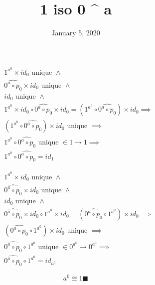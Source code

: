 \documentclass[fleqn, 11pt]{article}
\date{January 5, 2020}
\title{1 iso 0 ^ a}
\begin{document}

\begin{equation}
\tag{from}
\begin{aligned}
& 1^{a^0} \times id_0 \text{ unique } \land \\
& \widehat{0^a \circ p_0} \times id_0 \text{ unique } \land \\
& id_0 \text{ unique } \land \\
& 1^{a^0} \times id_0 \circ \widehat{0^a \circ p_0} \times id_0 =
  (1^{a^0} \circ \widehat{0^a \circ p_0}) \times id_0 \implies \\
& (1^{a^0} \circ \widehat{0^a \circ p_0}) \times id_0 \text{ unique }
  \implies \\
& 1^{a^0} \circ \widehat{0^a \circ p_0} \text{ unique } \in 1 \rightarrow 1
  \implies \\
& 1^{a^0} \circ \widehat{0^a \circ p_0} = id_1
\end{aligned}
\end{equation}

\begin{equation}
\tag{to}
\begin{aligned}
& 1^{a^0} \times id_0 \text{ unique } \land \\
& \widehat{0^a \circ p_0} \times id_0 \text{ unique } \land \\
& id_0 \text{ unique } \land \\
& \widehat{0^a \circ p_0} \times id_0 \circ 1^{a^0} \times id_0 =
  (\widehat{0^a \circ p_0} \circ 1^{a^0}) \times id_0 \implies \\
& (\widehat{0^a \circ p_0} \circ 1^{a^0}) \times id_0 \text{ unique } \implies \\
& \widehat{0^a \circ p_0} \circ 1^{a^0} \text{ unique } \in 
  0^{a^0} \rightarrow 0^{a^0} \implies \\
& \widehat{0^a \circ p_0} \circ 1^{a^0} = id_{a^0}
\end{aligned}
\end{equation}

\hrulefill

$$ a^0 \cong 1 \blacksquare $$
\end{document}
